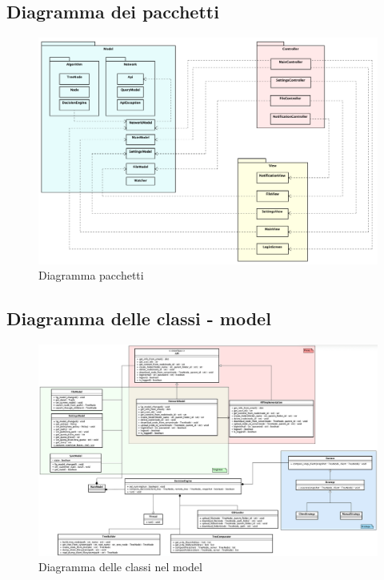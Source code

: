 \subsection{Diagramma dei pacchetti}
\begin{figure}[H]
    \centering
    \includegraphics[scale = 1]{components/img/diagramma-package.png}
    \caption{Diagramma pacchetti}
    \label{fig:diagramma pacchetti}
\end{figure}
\subsection{Diagramma delle classi - model}

\begin{figure}[H]
    \centering
    \includegraphics[scale = 0.8]{components/img/diagramma-classi-model.png}
    \caption{Diagramma delle classi nel model}
    \label{fig:Diagramma delle classi nel model}
\end{figure}

